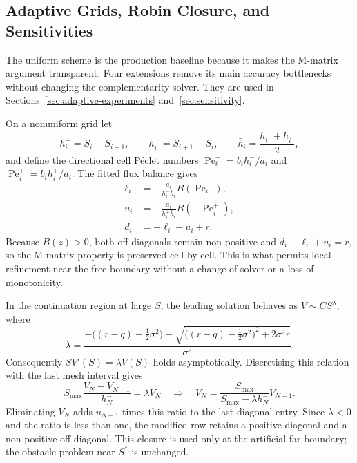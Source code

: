 \documentclass[11pt,a4paper]{article}
\theoremstyle{definition}
\theoremstyle{remark}
\begin{document}
\subsection{Adaptive Grids, Robin Closure, and Sensitivities}
\label{sec:advanced-methods}
The uniform scheme is the production baseline because it makes the
M-matrix argument transparent. Four extensions remove its main accuracy
bottlenecks without changing the complementarity solver. They are used in
Sections~\ref{sec:adaptive-experiments} and~\ref{sec:sensitivity}.

On a nonuniform grid let
\begin{equation}
    h_i^- = S_i-S_{i-1},
    \qquad
    h_i^+ = S_{i+1}-S_i,
    \qquad
    \bar h_i = \frac{h_i^-+h_i^+}{2},
    \label{eq:nonuniform-spacings}
\end{equation}
and define the directional cell P\'eclet numbers
$\operatorname{Pe}_i^-=b_ih_i^-/a_i$ and
$\operatorname{Pe}_i^+=b_ih_i^+/a_i$. The fitted flux balance gives
\begin{align}
    \ell_i &= -\frac{a_i}{h_i^-\bar h_i}B(\operatorname{Pe}_i^-),
    \label{eq:nonuniform-lower}\\
    u_i &= -\frac{a_i}{h_i^+\bar h_i}B(-\operatorname{Pe}_i^+),
    \label{eq:nonuniform-upper}\\
    d_i &= -\ell_i-u_i+r.
    \label{eq:nonuniform-diagonal}
\end{align}
Because $B(z)>0$, both off-diagonals remain non-positive and
$d_i+\ell_i+u_i=r$, so the M-matrix property is preserved cell by cell. This
is what permits local refinement near the free boundary without a change of
solver or a loss of monotonicity.

In the continuation region at large $S$, the leading solution behaves as
$V\sim C S^\lambda$, where
\begin{equation}
    \lambda=\frac{-\bigl((r-q)-\tfrac12\sigma^2\bigr)
    -\sqrt{\bigl((r-q)-\tfrac12\sigma^2\bigr)^2+2\sigma^2r}}{\sigma^2}.
    \label{eq:robin-lambda}
\end{equation}
Consequently $SV'(S)=\lambda V(S)$ holds asymptotically. Discretising this
relation with the last mesh interval gives
\begin{equation}
    S_{\max}\frac{V_N-V_{N-1}}{h_N^-}
    =\lambda V_N
    \quad\Longrightarrow\quad
    V_N=\frac{S_{\max}}{S_{\max}-\lambda h_N^-}V_{N-1}.
    \label{eq:robin-elimination}
\end{equation}
Eliminating $V_N$ adds $u_{N-1}$ times this ratio to the last diagonal
entry. Since $\lambda<0$ and the ratio is less than one, the modified row
retains a positive diagonal and a non-positive off-diagonal. This closure is
used only at the artificial far boundary; the obstacle problem near $S^*$ is
unchanged.
\end{document}
